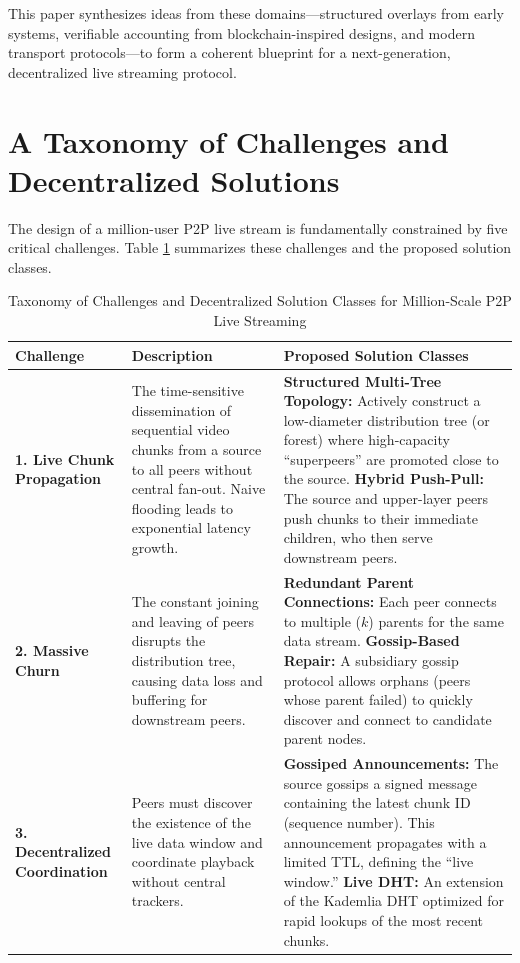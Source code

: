 \documentclass[journal]{IEEEtran}
\begin{document}
This paper synthesizes ideas from these domains---structured overlays from early systems, verifiable accounting from blockchain-inspired designs, and modern transport protocols---to form a coherent blueprint for a next-generation, decentralized live streaming protocol.

\section{A Taxonomy of Challenges and Decentralized Solutions}
The design of a million-user P2P live stream is fundamentally constrained by five critical challenges. Table \ref{tab:taxonomy} summarizes these challenges and the proposed solution classes.

\begin{table}[t]
\centering
\caption{Taxonomy of Challenges and Decentralized Solution Classes for Million-Scale P2P Live Streaming}
\label{tab:taxonomy}
\begin{tabular}{lp{6.2cm}p{7.8cm}}
\toprule
\textbf{Challenge} & \textbf{Description} & \textbf{Proposed Solution Classes} \\ \midrule
\textbf{1. Live Chunk Propagation} & 
The time-sensitive dissemination of sequential video chunks from a source to all peers without central fan-out. Naive flooding leads to exponential latency growth. & 
\textbf{Structured Multi-Tree Topology:} Actively construct a low-diameter distribution tree (or forest) where high-capacity ``superpeers'' are promoted close to the source. \newline
\textbf{Hybrid Push-Pull:} The source and upper-layer peers push chunks to their immediate children, who then serve downstream peers. \\ \midrule

\textbf{2. Massive Churn} & 
The constant joining and leaving of peers disrupts the distribution tree, causing data loss and buffering for downstream peers. & 
\textbf{Redundant Parent Connections:} Each peer connects to multiple ($k$) parents for the same data stream. \newline
\textbf{Gossip-Based Repair:} A subsidiary gossip protocol allows orphans (peers whose parent failed) to quickly discover and connect to candidate parent nodes. \\ \midrule

\textbf{3. Decentralized Coordination} & 
Peers must discover the existence of the live data window and coordinate playback without central trackers. & 
\textbf{Gossiped Announcements:} The source gossips a signed message containing the latest chunk ID (sequence number). This announcement propagates with a limited TTL, defining the ``live window.'' \newline
\textbf{Live DHT:} An extension of the Kademlia DHT \cite{mazieres2002kademlia} optimized for rapid lookups of the most recent chunks. \\ \midrule


\end{tabular}
\end{table}
\end{document}
